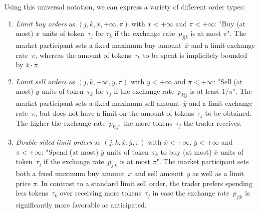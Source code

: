 \documentclass[11pt,parskip=full]{scrartcl}%
\begin{document}
Using this universal notation, we can express a variety of different order types:
\begin{enumerate}
  \item \emph{Limit buy orders} as $(j,k,\overline{x},+\infty,\pi)$
    with $\overline{x} < +\infty$ and $\pi < +\infty$:
  \vspace{.2cm}\newline
  "Buy (at most) $\overline{x}$ units of token~$\tau_j$ for $\tau_k$
  if the exchange rate~$p_{j|k}$ is at most $\pi$".
  \vspace{.2cm}\newline
  The market participant sets a fixed maximum buy amount~$\overline{x}$
  and a limit exchange rate~$\pi$, whereas the amount of tokens~$\tau_k$ to be spent is
  implicitely bounded by $\overline{x} \cdot \pi$.

  \item \emph{Limit sell orders} as $(j,k,+\infty,\overline{y},\pi)$
    with $\overline{y} < +\infty$ and $\pi < +\infty$:
  \vspace{.2cm}\newline
  "Sell (at most) $\overline{y}$ units of token~$\tau_k$ for $\tau_j$
  if the exchange rate~$p_{k|j}$ is at least $1/\pi$".
  \vspace{.2cm}\newline
  The market participant sets a fixed maximum sell amount~$\overline{y}$
  and a limit exchange rate~$\pi$, but does not have a limit on the amount of tokens~$\tau_j$
  to be obtained.
  The higher the exchange rate~$p_{k|j}$, the more tokens~$\tau_j$ the trader receives.
  \newpage

  \item \emph{Double-sided limit orders} as $(j,k,\overline{x},\overline{y},\pi)$
    with $\overline{x} < +\infty$, $\overline{y} < +\infty$ and $\pi < +\infty$:
  \vspace{.2cm}\newline
  "Spend (at most) $\overline{y}$ units of token~$\tau_k$
  to buy (at most) $\overline{x}$ units of token~$\tau_j$
  if the exchange rate~$p_{j|k}$ is at most $\pi$".
  \vspace{.2cm}\newline
  The market participant sets both a fixed maximum buy amount~$\overline{x}$
  and sell amount~$\overline{y}$ as well as a limit price $\pi$.
  In contrast to a standard limit sell order, the trader prefers spending less tokens~$\tau_k$
  over receiving more tokens~$\tau_j$ in case the exchange rate~$p_{j|k}$ is significantly
  more favorable as anticipated.


\end{enumerate}
\end{document}
